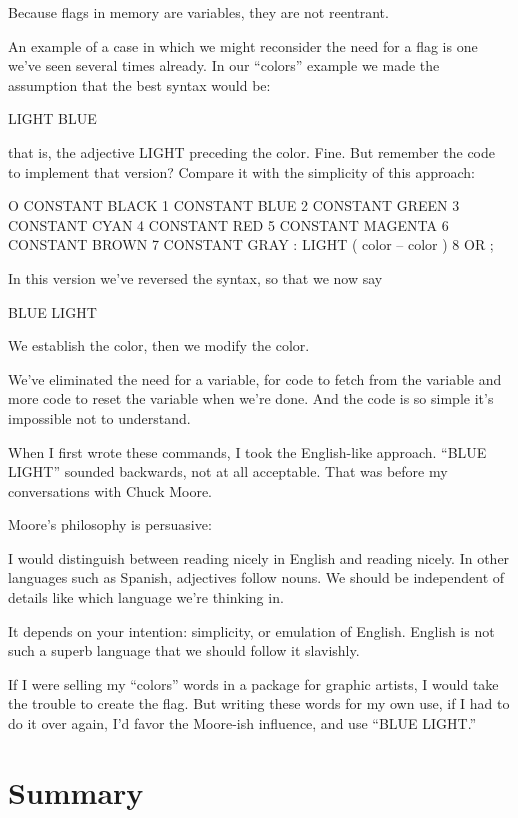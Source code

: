 Because flags in memory are variables, they are not reentrant.

An example of a case in which we might reconsider the need for a
flag is one we've seen several times already. In our ``colors'' example we
made the assumption that the best syntax would be:

\begin{Code}
LIGHT BLUE
\end{Code}
that is, the adjective LIGHT preceding the color. Fine. But remember the
code to implement that version? Compare it with the simplicity of this
approach:

\begin{Code}
O CONSTANT BLACK    1 CONSTANT BLUE    2 CONSTANT GREEN
3 CONSTANT CYAN     4 CONSTANT RED     5 CONSTANT MAGENTA
6 CONSTANT BROWN    7 CONSTANT GRAY
: LIGHT   ( color -- color )  8 OR ;
\end{Code}
In this version we've reversed the syntax, so that we now say

\begin{Code}
BLUE LIGHT
\end{Code}
We establish the color, then we modify the color.

We've eliminated the need for a variable, for code to fetch from the
variable and more code to reset the variable when we're done. And the
code is so simple it's impossible not to understand.

When I first wrote these commands, I took the English-like approach.
``BLUE LIGHT'' sounded backwards, not at all acceptable. That
was before my conversations with Chuck Moore.

\bigskip\blackline{2ex}
\noindent Moore's philosophy is persuasive:
\begin{tfquot}
I would distinguish between reading nicely in English and reading nicely.
In other languages such as Spanish, adjectives follow nouns. We should be
independent of details like which language we're thinking in.

It depends on your intention: simplicity, or emulation of English. English is
not such a superb language that we should follow it slavishly.
\end{tfquot}\blackline{1ex}
If I were selling my ``colors'' words in a package for graphic artists, I
would take the trouble to create the flag. But writing these words for my
own use, if I had to do it over again, I'd favor the Moore-ish influence,
and use ``BLUE LIGHT.''

\section{Summary}

